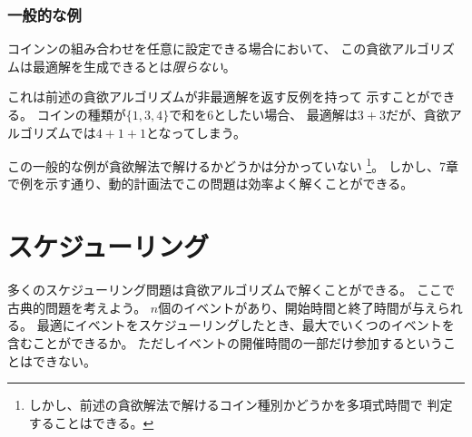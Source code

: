 \subsubsection{一般的な例}

コインンの組み合わせを任意に設定できる場合において、
この貪欲アルゴリズムは最適解を生成できるとは\emph{限らない}。

これは前述の貪欲アルゴリズムが非最適解を返す反例を持って
示すことができる。
コインの種類が$\{1,3,4\}$で和を6としたい場合、
最適解は$3+3$だが、貪欲アルゴリズムでは$4+1+1$となってしまう。

この一般的な例が貪欲解法で解けるかどうかは分かっていない
\footnote{しかし、前述の貪欲解法で解けるコイン種別かどうかを多項式時間で
判定することはできる\cite{pea05}。}。
しかし、7章で例を示す通り、動的計画法でこの問題は効率よく解くことができる。

\begin{comment}
\section{Scheduling}

Many scheduling problems can be solved
using greedy algorithms.
A classic problem is as follows:
Given $n$ events with their starting and ending
times, find a schedule
that includes as many events as possible.
It is not possible to select an event partially.
For example, consider the following events:
\begin{center}
\begin{tabular}{lll}
event & starting time & ending time \\
\hline
$A$ & 1 & 3 \\
$B$ & 2 & 5 \\
$C$ & 3 & 9 \\
$D$ & 6 & 8 \\
\end{tabular}
\end{center}
\end{comment}

\section{スケジューリング}

多くのスケジューリング問題は貪欲アルゴリズムで解くことができる。
ここで古典的問題を考えよう。
$n$個のイベントがあり、開始時間と終了時間が与えられる。
最適にイベントをスケジューリングしたとき、最大でいくつのイベントを
含むことができるか。
ただしイベントの開催時間の一部だけ参加するということはできない。

